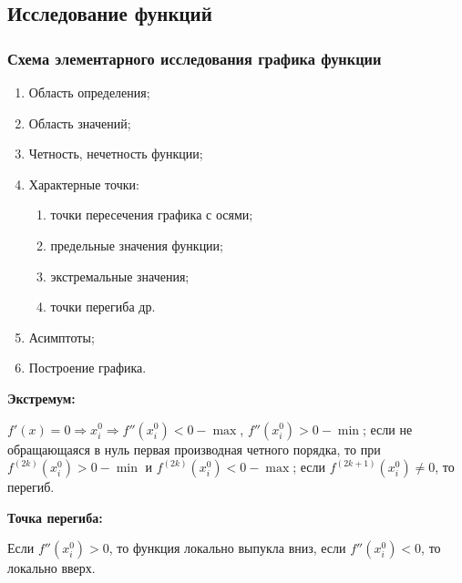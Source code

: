 \subsection{Исследование функций}

    \subsubsection{Схема элементарного исследования графика функции}
    
        \begin{enumerate}
        	\item Область определения;
        	
        	\item Область значений;
        	
        	\item Четность, нечетность функции;
        	
        	\item Характерные точки:
        	
        	\begin{enumerate}
        		\item точки пересечения графика с осями;
        		
        		\item предельные значения функции;
        		
        		\item экстремальные значения;
        		
        		\item точки перегиба др.
        	\end{enumerate}
        	
        	\item Асимптоты;
        	
        	\item Построение графика.
        \end{enumerate}

    \textbf{Экстремум:}

    $f' (x) = 0 \Rightarrow x^{0}_{i} \Rightarrow f'' (x^{0}_{i}) < 0 - \max$, $f'' (x^{0}_{i}) > 0 - \min$; если не обращающаяся в нуль первая производная четного порядка, то при $f^{(2 k)} (x^{0}_{i}) > 0 - \min$ и $f^{(2 k)} (x^{0}_{i}) < 0 - \max$; если $f^{(2 k + 1)} (x^{0}_{i}) \neq 0$, то перегиб.

    \textbf{Точка перегиба:}

    Если $f'' (x^{0}_{i}) > 0$, то функция локально выпукла вниз, если $f'' (x^{0}_{i}) < 0$, то локально вверх.

